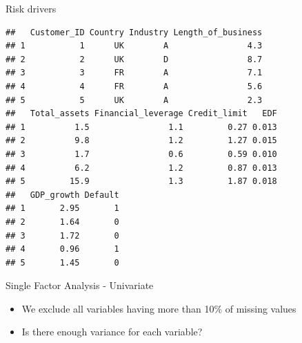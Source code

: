 \documentclass[9pt,ignorenonframetext,]{beamer}
\newenvironment{Shaded}{\begin{snugshade}}{\end{snugshade}}
\newcommand{\KeywordTok}[1]{\textcolor[rgb]{0.13,0.29,0.53}{\textbf{#1}}}
\newcommand{\StringTok}[1]{\textcolor[rgb]{0.31,0.60,0.02}{#1}}
\newcommand{\OperatorTok}[1]{\textcolor[rgb]{0.81,0.36,0.00}{\textbf{#1}}}
\newcommand{\NormalTok}[1]{#1}
\providecommand{\tightlist}{%
  \setlength{\itemsep}{0pt}\setlength{\parskip}{0pt}}
\begin{document}
\begin{frame}[fragile]{Risk drivers}

\begin{verbatim}
##   Customer_ID Country Industry Length_of_business
## 1           1      UK        A                4.3
## 2           2      UK        D                8.7
## 3           3      FR        A                7.1
## 4           4      FR        A                5.6
## 5           5      UK        A                2.3
##   Total_assets Financial_leverage Credit_limit   EDF
## 1          1.5                1.1         0.27 0.013
## 2          9.8                1.2         1.27 0.015
## 3          1.7                0.6         0.59 0.010
## 4          6.2                1.2         0.87 0.013
## 5         15.9                1.3         1.87 0.018
##   GDP_growth Default
## 1       2.95       1
## 2       1.64       0
## 3       1.72       0
## 4       0.96       1
## 5       1.45       0
\end{verbatim}

\end{frame}

\begin{frame}[fragile]{Single Factor Analysis - Univariate}

\begin{itemize}
\tightlist
\item
  We exclude all variables having more than 10\% of missing values
\item
  Is there enough variance for each variable?
\end{itemize}

\begin{Shaded}
\end{Shaded}

\end{frame}
\end{document}
